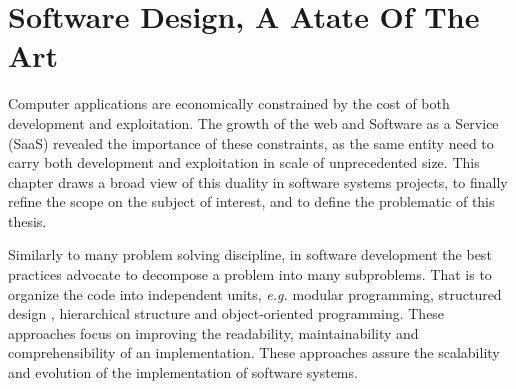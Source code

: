 \chapter{Software Design, A Atate Of The Art} \label{chapter3}
\minitoc
\eject

Computer applications are economically constrained by the cost of both development and exploitation.
The growth of the web and Software as a Service (SaaS) revealed the importance of these constraints, as the same entity need to carry both development and exploitation in scale of unprecedented size.
This chapter draws a broad view of this duality in software systems projects, to finally refine the scope on the subject of interest, and to define the problematic of this thesis.

Similarly to many problem solving discipline, in software development the best practices advocate to decompose a problem into many subproblems.
That is to organize the code into independent units, \textit{e.g.} modular programming, structured design \cite{Stevens1974}, hierarchical structure \cite{Dijkstra1968} and object-oriented programming.
These approaches focus on improving the readability, maintainability and comprehensibility of an implementation.
These approaches assure the scalability and evolution of the implementation of software systems.

